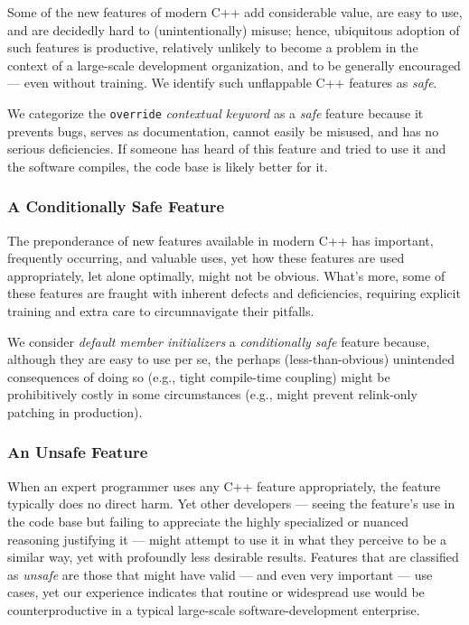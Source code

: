 Some of the new features of modern C++ add considerable value, are easy to use, and are decidedly hard to (unintentionally) misuse; hence, ubiquitous adoption of such features is productive, relatively unlikely to become a problem in the context of a large-scale development organization, and to be generally encouraged --- even without training. We identify such unflappable C++ features as \textit{safe}.

We categorize the \texttt{override} \textit{contextual keyword} as a \textit{safe} feature because it prevents bugs, serves as documentation, cannot easily be misused, and has no serious deficiencies. If someone has heard of this feature and tried to use it and the software compiles, the code base is likely better for it.

\subsubsection[A {\it Conditionally Safe} Feature]{A {\sfbsubsubsecitalRomeo Conditionally Safe} Feature}

The preponderance of new features available in modern C++ has important, frequently occurring, and valuable uses, yet how these features are used appropriately, let alone optimally, might not be obvious. What's more, some of these features are fraught with inherent defects and deficiencies, requiring explicit training and extra care to circumnavigate their pitfalls. 
 
We consider \textit{default member initializers} a \textit{conditionally safe} feature because, although they are easy to use per se, the perhaps (less-than-obvious) unintended consequences of doing so (e.g., tight compile-time coupling) might be prohibitively costly in some circumstances (e.g., might prevent relink-only patching in production).

\subsubsection[An {\it Unsafe} Feature]{An {\sfbsubsubsecitalRomeo Unsafe} Feature}

When an expert programmer uses any C++ feature appropriately, the feature typically does no direct harm. Yet other developers --- seeing the feature's use in the code base but failing to appreciate the highly specialized or nuanced reasoning justifying it --- might attempt to use it in what they perceive to be a similar way, yet with profoundly less desirable results. Features that are classified as \textit{unsafe} are those that might have valid --- and even very important --- use cases, yet our experience indicates that routine or widespread use would be counterproductive in a typical large-scale software-development enterprise.

